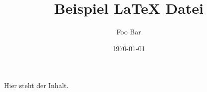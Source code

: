 \documentclass[a4paper]{scrartcl}
\title{Beispiel \LaTeX{ Datei}}
\author{Foo Bar}
\date{\today}
\begin{document}
\maketitle

Hier steht der Inhalt.
\end{document}
